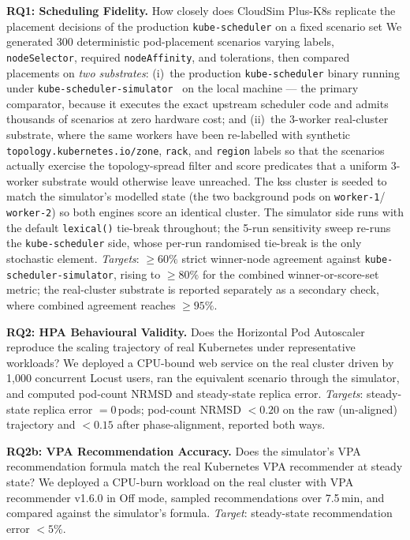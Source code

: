 \documentclass[ASNA,twocolumn]{USG}
\newcommand{\ckm}{CloudSim Plus-K8s\xspace}
\begin{document}
    \textbf{RQ1: Scheduling Fidelity.} How closely does \ckm
    replicate the placement decisions of the production
    \texttt{kube-scheduler} on a fixed scenario set We generated 300
    deterministic pod-placement scenarios varying labels,
    \texttt{nodeSelector}, required \texttt{nodeAffinity}, and
    tolerations, then compared placements on \emph{two substrates}:
    (i)~the production \texttt{kube-scheduler} binary running under
    \texttt{kube-scheduler-simulator}~\cite{KubeSchSim2025} on the local
    machine --- the primary comparator, because it executes the exact
    upstream scheduler code and admits thousands of scenarios at zero
    hardware cost; and (ii)~the 3-worker real-cluster substrate, where
    the same workers have been re-labelled with synthetic
    \texttt{topology.kubernetes.io/zone}, \texttt{rack}, and
    \texttt{region} labels so that the
    scenarios actually exercise the topology-spread filter and score
    predicates that a uniform 3-worker substrate would otherwise leave
    unreached. The kss cluster is seeded to match the simulator's
    modelled state (the two background pods on \texttt{worker-1}/%
    \texttt{worker-2}) so both engines score an identical cluster. The
    simulator side runs with the default \texttt{lexical()} tie-break
    throughout; the 5-run sensitivity sweep re-runs the
    \texttt{kube-scheduler} side, whose per-run randomised tie-break is
    the only stochastic element.
    \emph{Targets}: $\geq 60\%$ strict winner-node agreement against
    \texttt{kube-scheduler-simulator}, rising to $\geq 80\%$ for the
    combined winner-or-score-set metric; the real-cluster substrate is
    reported separately as a secondary check, where combined agreement
    reaches $\geq 95\%$.

    \textbf{RQ2: HPA Behavioural Validity.} Does the Horizontal Pod
    Autoscaler reproduce the scaling trajectory of real Kubernetes under
    representative workloads? We deployed a CPU-bound web service on the
    real cluster driven by 1{,}000 concurrent Locust users, ran the
    equivalent scenario through the simulator, and computed pod-count
    NRMSD and steady-state replica error.
    \emph{Targets}: steady-state replica error $= 0$\,pods; pod-count
    NRMSD $< 0.20$ on the raw (un-aligned) trajectory and $< 0.15$ after
    phase-alignment, reported both ways.

    \textbf{RQ2b: VPA Recommendation Accuracy.} Does the simulator's VPA
    recommendation formula match the real Kubernetes VPA recommender at
    steady state? We deployed a CPU-burn workload on the real cluster
    with VPA recommender v1.6.0 in Off mode, sampled recommendations over
    7.5\,min, and compared against the simulator's formula.
    \emph{Target}: steady-state recommendation error $< 5\%$.
\end{document}
